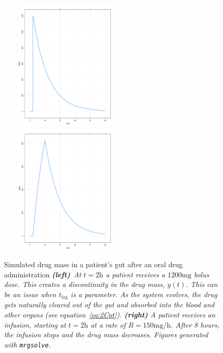 \documentclass[11pt]{article}
\begin{document}
\begin{figure}[!htb]
\begin{center}
\includegraphics[width = 2.5in, height = 2.5in, trim=0in 0in 0 0in]{graphics/BolusDose.pdf}
\includegraphics[width = 2.5in, height = 2.5in, trim=0in 0in 0 0in]{graphics/Infusion.pdf}
\caption{Simulated drug mass in a patient's gut after an oral drug administration 
\textit{\hbox{\textbf{(left)} At} $t = 2 \mathrm{h}$ a patient receives a $1200 \mathrm{mg}$
bolus dose. This creates a discontinuity in the drug mass, $y(t)$. This can be an issue
when $t_\mathrm{lag}$ is a parameter. As the system evolves, 
the drug gets naturally cleared out of the gut and absorbed into the blood and other organs (see 
equation~\ref{eq:2Cpt}).  \textbf{(right)} A patient receives an infusion, starting at $t = 2\mathrm{h}$
at a rate of $R = 150\mathrm{mg/h}$. After 8 hours, the infusion stops and the drug mass decreases.
Figures generated with \texttt{mrgsolve}.}} 
\label{fig:bolus}
\end{center}
\end{figure}
\end{document}
